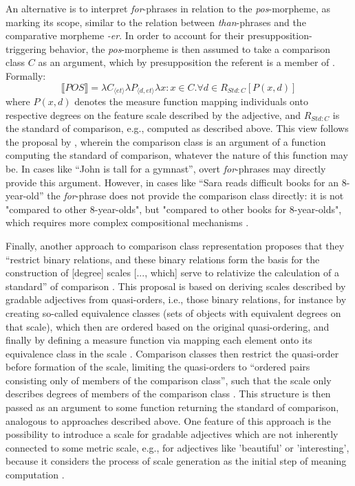 An alternative is to interpret \textit{for}-phrases in relation to the \textit{pos}-morpheme, as marking its scope, similar to the relation between \textit{than}-phrases and the comparative morpheme \textit{-er}. In order to account for their presupposition-triggering behavior, the \textit{pos}-morpheme is then assumed to take a comparison class $C$ as an argument, which by presupposition the referent is a member of \parencite{Solt2009}. 
Formally:
\begin{equation}
\llbracket POS \rrbracket = \lambda C_{\langle et \rangle } \lambda P_{\langle d, et \rangle } \lambda x: x \in C.\forall d \in R_{Std:C}[P(x,d)]
\end{equation} 
where $P(x,d)$ denotes the measure function mapping individuals onto respective degrees on the feature scale described by the adjective, and $R_{Std:C}$ is the standard of comparison, e.g., computed as described above.
This view follows the proposal by \textcite{bartsch1972}, wherein the comparison class is an argument of a function computing the standard of comparison, whatever the nature of this function may be.  In cases like “John is tall for a gymnast”, overt \textit{for}-phrases may directly provide this argument. However, in cases like “Sara reads difficult books for an 8-year-old” the \emph{for}-phrase does not provide the comparison class directly: it is not "compared to other 8-year-olds", but "compared to other books for 8-year-olds", which requires more complex compositional mechanisms \parencite[e.g., as suggetsed by][]{Solt2009}. %

Finally, another approach to comparison class representation proposes that they “restrict binary relations, and these binary relations form the basis for the construction of [degree] scales [..., which] serve to relativize the calculation of a standard” of comparison \parencite[p.170]{Bale2011}. This proposal is based on deriving scales described by gradable adjectives from quasi-orders, i.e., those binary relations, for instance by creating so-called equivalence classes (sets of objects with equivalent degrees on that scale), which then are ordered based on the original quasi-ordering, and finally by defining a measure function via mapping each element onto its equivalence class in the scale \parencite{Bale2011}. Comparison classes then restrict the quasi-order before formation of the scale, limiting the quasi-orders to “ordered pairs consisting only of members of the comparison class”, such that the scale only describes degrees of members of the comparison class \parencite[p.178]{Bale2011}. This structure is then passed as an argument to some function returning the standard of comparison, analogous to approaches described above. One feature of this approach is the possibility to introduce a scale for gradable adjectives which are not inherently connected to some metric scale, e.g., for adjectives like 'beautiful' or 'interesting', because it considers the process of scale generation as the initial step of meaning computation \parencite{Bale2011}.   

